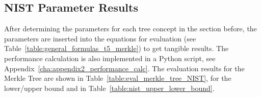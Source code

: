 
\subsection{NIST Parameter Results}
After determining the parameters for each tree concept in the section before, the parameters are inserted into the equations for evaluation (see Table~\ref{table:general_formulas_t5_merkle}) to get tangible results. The performance calculation is also implemented in a Python script, see Appendix~\ref{cha:appendix2_performance_calc}.
The evaluation results for the Merkle Tree are shown in Table~\ref{table:eval_merkle_tree_NIST}, for the lower/upper bound \tftree and \extree in Table~\ref{table:nist_upper_lower_bound}.

